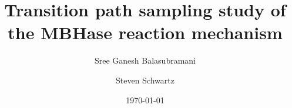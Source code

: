 \documentclass[%
preprint,
 amsmath,amssymb,
 aps,
prb,
]{revtex4-2}
\begin{document}

\title{Transition path sampling study of the MBHase reaction mechanism}%

\author{Sree Ganesh Balasubramani}
\author{Steven Schwartz}%
%




\date{\today}%


\maketitle
\end{document}
